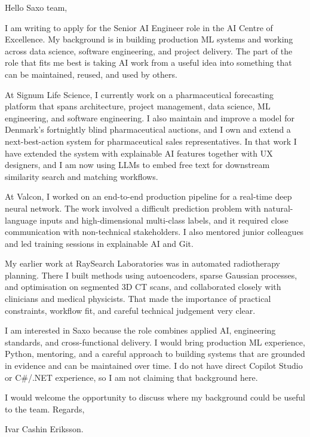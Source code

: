 \documentclass[11pt,a4paper]{moderncv}
\begin{document}
\makecvtitle
Hello Saxo team,

\vspace*{2em}
I am writing to apply for the Senior AI Engineer role in the AI Centre of Excellence. My background is in building production ML systems and working across data science, software engineering, and project delivery. The part of the role that fits me best is taking AI work from a useful idea into something that can be maintained, reused, and used by others.

\hspace*{2em}
At Signum Life Science, I currently work on a pharmaceutical forecasting platform that spans architecture, project management, data science, ML engineering, and software engineering. I also maintain and improve a model for Denmark's fortnightly blind pharmaceutical auctions, and I own and extend a next-best-action system for pharmaceutical sales representatives. In that work I have extended the system with explainable AI features together with UX designers, and I am now using LLMs to embed free text for downstream similarity search and matching workflows.

\hspace*{2em}
At Valcon, I worked on an end-to-end production pipeline for a real-time deep neural network. The work involved a difficult prediction problem with natural-language inputs and high-dimensional multi-class labels, and it required close communication with non-technical stakeholders. I also mentored junior colleagues and led training sessions in explainable AI and Git.

\hspace*{2em}
My earlier work at RaySearch Laboratories was in automated radiotherapy planning. There I built methods using autoencoders, sparse Gaussian processes, and optimisation on segmented 3D CT scans, and collaborated closely with clinicians and medical physicists. That made the importance of practical constraints, workflow fit, and careful technical judgement very clear.

\hspace*{2em}
I am interested in Saxo because the role combines applied AI, engineering standards, and cross-functional delivery. I would bring production ML experience, Python, mentoring, and a careful approach to building systems that are grounded in evidence and can be maintained over time. I do not have direct Copilot Studio or C#/.NET experience, so I am not claiming that background here.

\vspace*{2em}
I would welcome the opportunity to discuss where my background could be useful to the team. Regards,

\vspace*{1em}
Ivar Cashin Eriksson.
\end{document}
